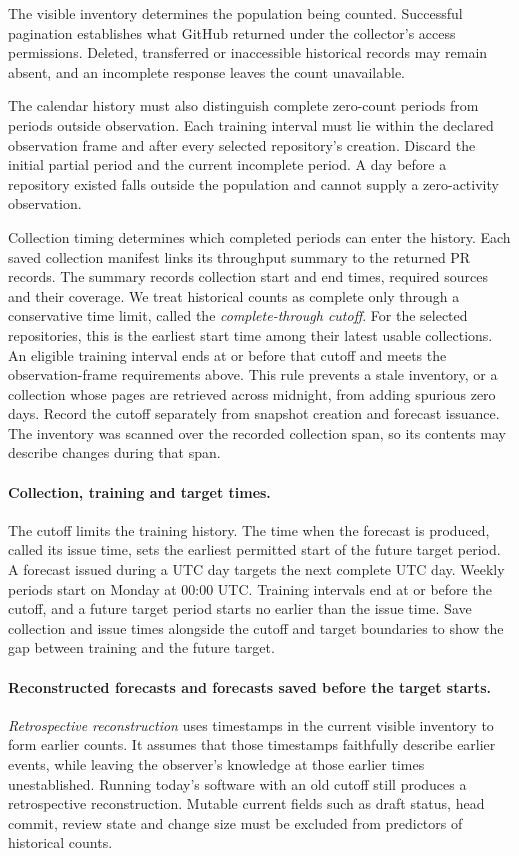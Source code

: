 \documentclass[11pt,a4paper]{article}
\begin{document}
The visible inventory determines the population being counted. Successful pagination establishes what GitHub returned under the collector's access permissions. Deleted, transferred or inaccessible historical records may remain absent, and an incomplete response leaves the count unavailable.

The calendar history must also distinguish complete zero-count periods from periods outside observation. Each training interval must lie within the declared observation frame and after every selected repository's creation. Discard the initial partial period and the current incomplete period. A day before a repository existed falls outside the population and cannot supply a zero-activity observation.

Collection timing determines which completed periods can enter the history. Each saved collection manifest links its throughput summary to the returned PR records. The summary records collection start and end times, required sources and their coverage. We treat historical counts as complete only through a conservative time limit, called the \emph{complete-through cutoff}. For the selected repositories, this is the earliest start time among their latest usable collections. An eligible training interval ends at or before that cutoff and meets the observation-frame requirements above. This rule prevents a stale inventory, or a collection whose pages are retrieved across midnight, from adding spurious zero days. Record the cutoff separately from snapshot creation and forecast issuance. The inventory was scanned over the recorded collection span, so its contents may describe changes during that span.

\paragraph{Collection, training and target times.}
The cutoff limits the training history. The time when the forecast is produced, called its issue time, sets the earliest permitted start of the future target period. A forecast issued during a UTC day targets the next complete UTC day. Weekly periods start on Monday at 00:00 UTC. Training intervals end at or before the cutoff, and a future target period starts no earlier than the issue time. Save collection and issue times alongside the cutoff and target boundaries to show the gap between training and the future target.

\paragraph{Reconstructed forecasts and forecasts saved before the target starts.}
\emph{Retrospective reconstruction} uses timestamps in the current visible inventory to form earlier counts. It assumes that those timestamps faithfully describe earlier events, while leaving the observer's knowledge at those earlier times unestablished. Running today's software with an old cutoff still produces a retrospective reconstruction. Mutable current fields such as draft status, head commit, review state and change size must be excluded from predictors of historical counts.
\end{document}
